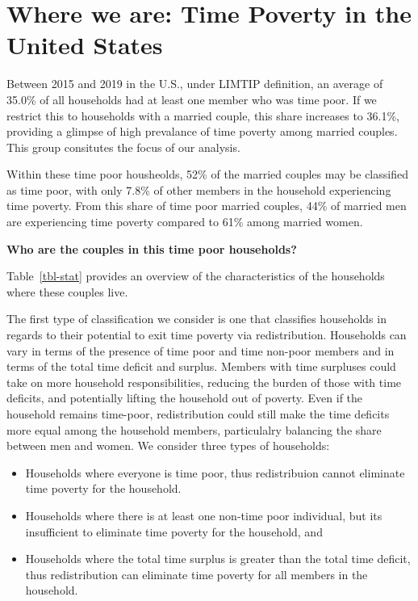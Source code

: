 \documentclass[
  11pt,
]{article}
\providecommand{\tightlist}{%
  \setlength{\itemsep}{0pt}\setlength{\parskip}{0pt}}\usepackage{longtable,booktabs,array}
\begin{document}
\section{Where we are: Time Poverty in the United
States}\label{where-we-are-time-poverty-in-the-united-states}

Between 2015 and 2019 in the U.S., under LIMTIP definition, an average
of 35.0\% of all households had at least one member who was time poor.
If we restrict this to households with a married couple, this share
increases to 36.1\%, providing a glimpse of high prevalance of time
poverty among married couples. This group consitutes the focus of our
analysis.

Within these time poor housheolds, 52\% of the married couples may be
classified as time poor, with only 7.8\% of other members in the
household experiencing time poverty. From this share of time poor
married couples, 44\% of married men are experiencing time poverty
compared to 61\% among married women.

\textbf{Who are the couples in this time poor households?}

Table~\ref{tbl-stat} provides an overview of the characteristics of the
households where these couples live.

The first type of classification we consider is one that classifies
households in regards to their potential to exit time poverty via
redistribution. Households can vary in terms of the presence of time
poor and time non-poor members and in terms of the total time deficit
and surplus. Members with time surpluses could take on more household
responsibilities, reducing the burden of those with time deficits, and
potentially lifting the household out of poverty. Even if the household
remains time-poor, redistribution could still make the time deficits
more equal among the household members, particulalry balancing the share
between men and women. We consider three types of households:

\begin{itemize}
\tightlist
\item
  Households where everyone is time poor, thus redistribuion cannot
  eliminate time poverty for the household.
\item
  Households where there is at least one non-time poor individual, but
  its insufficient to eliminate time poverty for the household, and
\item
  Households where the total time surplus is greater than the total time
  deficit, thus redistribution can eliminate time poverty for all
  members in the household.
\end{itemize}
\end{document}
